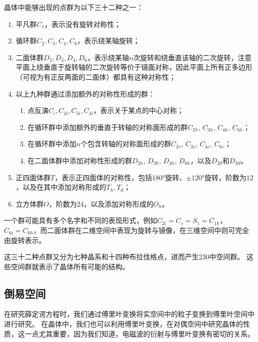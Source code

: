 \begin{proposition}
    晶体中能够出现的点群为以下三十二种之一：
    \begin{enumerate}
        \item 平凡群$C_1$，表示没有旋转对称性；
        \item 循环群$C_2, C_3, C_4, C_6$，表示绕某轴旋转；
        \item 二面体群$D_2, D_3, D_4, D_6$，表示绕某轴$n$次旋转和绕垂直该轴的二次旋转，注意平面上绕垂直于旋转轴的二次旋转等价于镜面对称，因此平面上所有正多边形（可视为有正反两面的二面体）都具有这种对称性；
        \item 以上九种群通过添加额外的对称性形成的群：
        \begin{enumerate}
            \item 点反演$C_i, C_{2i}, C_{3i}, C_{4i}$，表示关于某点的中心对称；
            \item 在循环群中添加额外的垂直于转轴的对称面形成的群$C_{2h}$, $C_{3h}$, $C_{4h}$, $C_{6h}$；
            \item 在循环群中添加$n$个包含转轴的对称面形成的群$C_{2v}$, $C_{3v}$, $C_{4v}$, $C_{6v}$；
            \item 在二面体群中添加对称性形成的群$D_{2h}$, $D_{3h}$, $D_{4h}$, $D_{6h}$，以及$D_{2d}$和$D_{3d}$。
        \end{enumerate}
        \item 正四面体群$T$，表示正四面体的对称性，包括$\ang{180}$旋转、$\pm\ang{120}$旋转，阶数为$12$，以及在其中添加对称形成的$T_h, T_d$；
        \item 立方体群$O$，阶数为$24$，以及添加对称形成的$O_h$。
    \end{enumerate}
\end{proposition}

一个群可能具有多个名字和不同的表现形式，例如$C_{2i} = C_s = S_1 = C_{1h}$，$C_{6i} = C_{6h}$，而二面体群在二维空间中表现为旋转与镜像，在三维空间中则可完全由旋转表示。

这三十二种点群又分为七种晶系和十四种布拉伐格点，进而产生230中空间群。
这些空间群就表示了晶体所有可能的结构。

\subsection{倒易空间}

在研究薛定谔方程时，我们通过傅里叶变换将实空间中的粒子变换到傅里叶空间中进行研究。
在晶体中，我们也可以利用傅里叶变换，在对偶空间中研究晶体的性质，这一点尤其重要，因为我们知道，电磁波的衍射与傅里叶变换有密切的关系。

